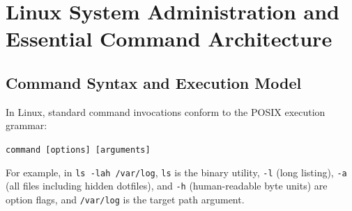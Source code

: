 \section{Linux System Administration and Essential Command Architecture}
\label{sec:os_linux_commands}

\subsection{Command Syntax and Execution Model}
In Linux, standard command invocations conform to the POSIX execution grammar:
\begin{center}
\texttt{command [options] [arguments]}
\end{center}
For example, in \texttt{ls -lah /var/log}, \texttt{ls} is the binary utility, \texttt{-l} (long listing), \texttt{-a} (all files including hidden dotfiles), and \texttt{-h} (human-readable byte units) are option flags, and \texttt{/var/log} is the target path argument.

